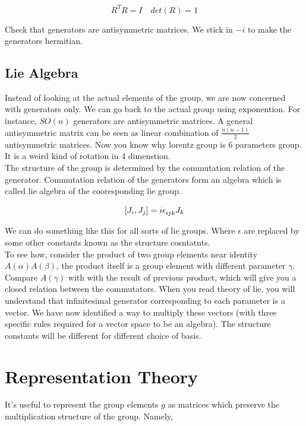 \documentclass{report}
\begin{document}
$$R^{T}R = I \quad det(R) = 1$$

\noindent Check that generators are antisymmetric matrices. We stick in $-i$ to make the generators hermitian.

\subsection{Lie Algebra}

Instead of looking at the actual elements of the group, we are now concerned with generators only. We can go back to the actual group using exponention. For instance, $SO(n)$ generators are antisymmetric matrices. A general antisymmetric matrix can be seen as linear combination of $\frac{n(n-1)}{2}$ antisymmetric matrices. Now you know why lorentz group is $6$ parameters group. It is a weird kind of rotation in $4$ dimenstion.\\

\noindent The structure of the group is determined by the commutation relation of the generator. Commutation relation of the generators form an algebra which is called lie algebra of the cooresponding lie group.

$$[J_i, J_j] = i\epsilon\indices{_i_j_k}J_k$$

\noindent We can do something like this for all sorts of lie groups. Where $\epsilon$ are replaced by some other constants known as the structure cosntatnts.\\

\noindent To see how, consider the product of two group elements near identity $A(\alpha)A(\beta)$, the product itself is a group element with different parameter $\gamma$. Compare $A(\gamma)$ with with the result of previous product, which will give you a closed relation between the commutators. When you read theory of lie, you will understand that infinitesimal generator corresponding to each parameter is a vector. We have now identified a way to multiply these vectors (with three specific rules required for a vector space to be an algebra). The structure constants will be different for different choice of basis.

\section{Representation Theory}

It's useful to represent the group elements $g$ as matrices which preserve the multiplication structure of the group. Namely,
\end{document}
